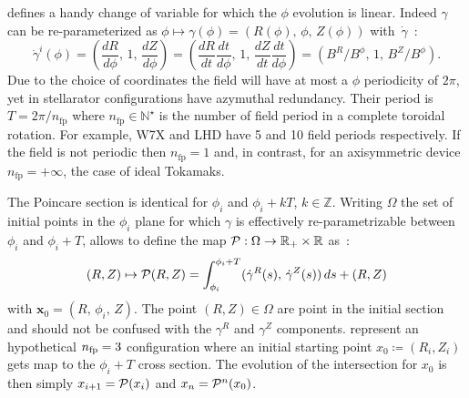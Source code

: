 defines a handy change of variable for which the $\phi$ evolution is linear. Indeed $\gamma$ can be re-parameterized as $\phi \mapsto \gamma(\phi) = (R(\phi),\,\phi,\,Z(\phi))$ with~$\dot{\gamma}$~:
\begin{equation*}
    \dot{\gamma}^i(\phi) = (\frac{dR}{d\phi},\,1,\,\frac{dZ}{d\phi}) = (\frac{dR}{dt}\frac{dt}{d\phi},\,1,\,\frac{dZ}{dt}\frac{dt}{d\phi}) = (B^R/B^\phi,\, 1,\,B^Z/B^\phi).
\end{equation*}
Due to the choice of coordinates the field will have at most a $\phi$ periodicity of $2\pi$, yet in stellarator configurations have azymuthal redundancy. Their period is $T = 2\pi/n_\text{fp}$ where $n_\text{fp}\in\mathbb{N}^\star$ is the number of field period in a complete toroidal rotation. For example, W7X and LHD have 5 and 10 field periods respectively. If the field is not periodic then $n_\text{fp} = 1$ and, in contrast, for an axisymmetric device $n_\text{fp} = +\infty$, the case of ideal Tokamaks.

The Poincare section is identical for $\phi_i$ and $\phi_i+kT$, $k\in\mathbb{Z}$. Writing $\Omega$ the set of initial points in the $\phi_i$ plane for which $\gamma$ is effectively re-parametrizable between $\phi_i$ and $\phi_i + T$, allows to define the map $\mathcal{P} : \Omega \rightarrow \mathbb{R}_+\times\mathbb{R}$ as~:
\begin{equation}\label{eq:pmap}
    (R,Z) \mapsto \mathcal{P}(R,Z) = \int_{\phi_i}^{\phi_i+T}(
        \dot{\gamma}^R(s),\,
        \dot{\gamma}^Z(s)
    )\,ds + (R,Z)
\end{equation}
with $\textbf{x}_0 = (R,\,\phi_i,\,Z)$. 
The point $(R,Z) \in \Omega$ are point in the initial section and should not be confused with the $\gamma^R$ and $\gamma^Z$ components.  represent an hypothetical $n_\text{fp} = 3$ configuration where an initial starting point $x_0\coloneqq (R_i,Z_i)$ gets map to the $\phi_i + T$ cross section. The evolution of the intersection for $x_0$ is then simply $x_{i+1} = \mathcal{P}(x_i)$ and $x_n = \mathcal{P}^n(x_0)$. 

